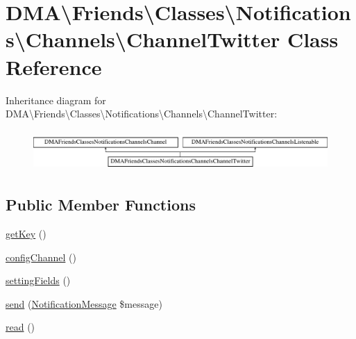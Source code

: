 \hypertarget{classDMA_1_1Friends_1_1Classes_1_1Notifications_1_1Channels_1_1ChannelTwitter}{\section{D\+M\+A\textbackslash{}Friends\textbackslash{}Classes\textbackslash{}Notifications\textbackslash{}Channels\textbackslash{}Channel\+Twitter Class Reference}
\label{classDMA_1_1Friends_1_1Classes_1_1Notifications_1_1Channels_1_1ChannelTwitter}
}
Inheritance diagram for D\+M\+A\textbackslash{}Friends\textbackslash{}Classes\textbackslash{}Notifications\textbackslash{}Channels\textbackslash{}Channel\+Twitter\+:\begin{figure}[H]
\begin{center}
\leavevmode
\includegraphics[height=1.546961cm]{dd/d13/classDMA_1_1Friends_1_1Classes_1_1Notifications_1_1Channels_1_1ChannelTwitter}
\end{center}
\end{figure}
\subsection*{Public Member Functions}
\begin{DoxyCompactItemize}
\item 
\hyperlink{classDMA_1_1Friends_1_1Classes_1_1Notifications_1_1Channels_1_1ChannelTwitter_a8fd04af027221ee77d05e70919c9bd11}{get\+Key} ()
\item 
\hyperlink{classDMA_1_1Friends_1_1Classes_1_1Notifications_1_1Channels_1_1ChannelTwitter_a6e5f6e1abe8d6b7c9d0442c3f2560b44}{config\+Channel} ()
\item 
\hyperlink{classDMA_1_1Friends_1_1Classes_1_1Notifications_1_1Channels_1_1ChannelTwitter_a51e362d79b1978fa683709e2794cb6d5}{setting\+Fields} ()
\item 
\hyperlink{classDMA_1_1Friends_1_1Classes_1_1Notifications_1_1Channels_1_1ChannelTwitter_a14439c4b83e7d0e0dd0437f141a998e5}{send} (\hyperlink{classDMA_1_1Friends_1_1Classes_1_1Notifications_1_1NotificationMessage}{Notification\+Message} \$message)
\item 
\hyperlink{classDMA_1_1Friends_1_1Classes_1_1Notifications_1_1Channels_1_1ChannelTwitter_a3b453a0cb63ace5be8f33763949af5b1}{read} ()
\end{DoxyCompactItemize}


